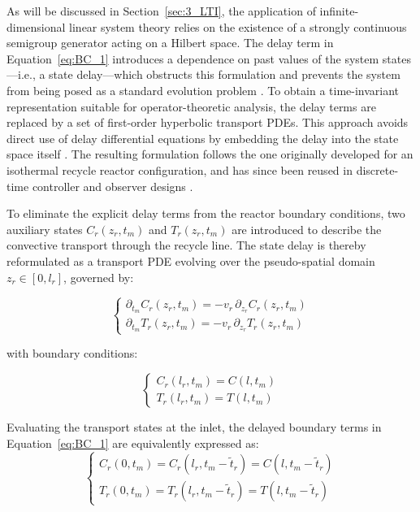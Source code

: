 As will be discussed in Section~\ref{sec:3_LTI}, the application of infinite-dimensional linear system theory relies on the existence of a strongly continuous semigroup generator acting on a Hilbert space. The delay term in Equation~\eqref{eq:BC_1} introduces a dependence on past values of the system states—i.e., a state delay—which obstructs this formulation and prevents the system from being posed as a standard evolution problem \autocite{Curtain2020Introduction}. To obtain a time-invariant representation suitable for operator-theoretic analysis, the delay terms are replaced by a set of first-order hyperbolic transport PDEs. This approach avoids direct use of delay differential equations by embedding the delay into the state space itself \autocite{Krstic2009Delay}. The resulting formulation follows the one originally developed for an isothermal recycle reactor configuration, and has since been reused in discrete-time controller and observer designs \autocite{moadeli2025optimal,Moadeli2025Model,Moadeli2025Observer}.

To eliminate the explicit delay terms from the reactor boundary conditions, two auxiliary states $C_r(z_r, t_m)$ and $T_r(z_r, t_m)$ are introduced to describe the convective transport through the recycle line. The state delay is thereby reformulated as a transport PDE evolving over the pseudo-spatial domain $z_r \in [0, l_r]$, governed by:

\begin{equation} \label{eq:transport_PDE}
    \begin{cases}
        \partial_{t_m} C_r(z_r, t_m) = - v_r \, \partial_{z_r} C_r(z_r, t_m) \\
        \partial_{t_m} T_r(z_r, t_m) = - v_r \, \partial_{z_r} T_r(z_r, t_m)
    \end{cases}
\end{equation}

with boundary conditions:

\begin{equation} \label{eq:transport_BC}
    \begin{cases}
        C_r(l_r, t_m) = C(l, t_m) \\
        T_r(l_r, t_m) = T(l, t_m)
    \end{cases}
\end{equation}

Evaluating the transport states at the inlet, the delayed boundary terms in Equation~\eqref{eq:BC_1} are equivalently expressed as:
\begin{equation} \label{eq:delay_identity}
    \begin{cases}
        C_r(0, t_m) = C_r(l_r, t_m - \tilde{t}_r) = C(l, t_m - \tilde{t}_r) \\
        T_r(0, t_m) = T_r(l_r, t_m - \tilde{t}_r) = T(l, t_m - \tilde{t}_r)
    \end{cases}
\end{equation}

